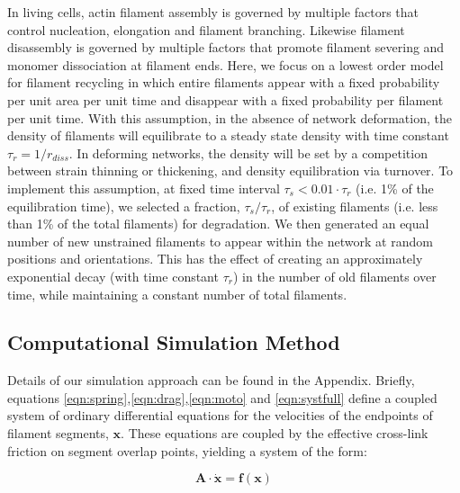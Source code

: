 \documentclass[10pt,letterpaper]{article}
\begin{document}
In living cells, actin filament assembly is governed by multiple factors that control nucleation, elongation and filament branching. Likewise filament disassembly is governed by multiple factors that promote filament severing and monomer dissociation at filament ends. Here, we focus on a lowest order model for filament recycling in which entire filaments appear with a fixed probability per unit area per unit time and disappear with a fixed probability per filament per unit time. With this assumption, in the absence of network deformation, the density of filaments will equilibrate to a steady state density with time constant $\tau_r = 1/r_{diss}$.   In deforming networks, the density will be set by a competition between strain thinning or thickening, and density equilibration via turnover. To implement this assumption, at fixed time interval $\tau_s < 0.01\cdot\tau_r$ (i.e. 1\% of the equilibration time), we selected a fraction, $\tau_s/\tau_r$, of existing filaments (i.e. less than 1\% of the total filaments) for degradation. We then generated an equal number of new unstrained filaments to appear within the network at random positions and orientations. This has the effect of creating an approximately exponential decay (with time constant $\tau_r$) in the number of old filaments over time, while maintaining a constant number of total filaments.


\subsection*{Computational Simulation Method}

Details of our simulation approach can be found in the Appendix. Briefly, equations \ref{eqn:spring},\ref{eqn:drag},\ref{eqn:moto} and \ref{eqn:systfull} define a coupled system of ordinary differential equations for the velocities of the endpoints of filament segments, $\mathbf{x}$.  These equations are coupled by the effective cross-link friction on segment overlap points, yielding a system of the form:

\begin{equation}
\mathbf{A \cdot \dot x} = \mathbf{f(x)}
\end{equation}
\end{document}
